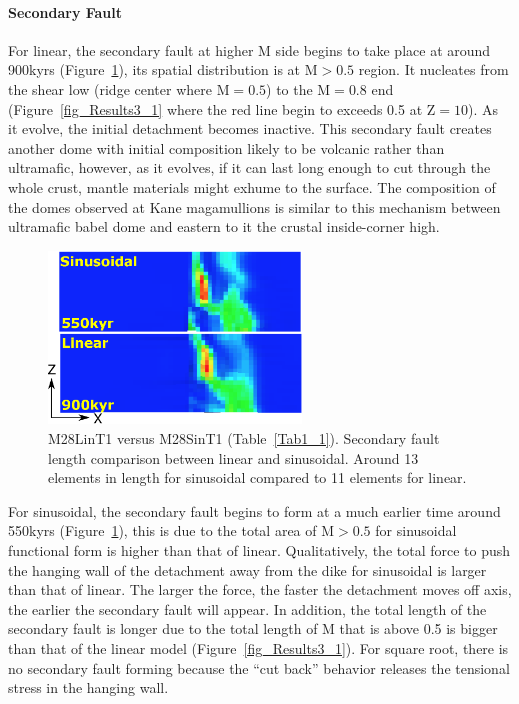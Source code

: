 \paragraph{Secondary Fault}\label{para_SecondaryFault}

For linear, the secondary fault at higher M side begins to take place at around 900kyrs (Figure~\hyperref[fig_Results4_2]{\ref{fig_Results4_2}}), its spatial distribution is at M$>0.5$ region. It nucleates from the shear low (ridge center where M$=0.5$) to the M$=0.8$ end (Figure~\hyperref[fig_Results3_1]{\ref{fig_Results3_1}} where the red line begin to exceeds 0.5 at Z$=10$). As it evolve, the initial detachment becomes inactive. This secondary fault creates another dome with initial composition likely to be volcanic rather than ultramafic, however, as it evolves, if it can last long enough to cut through the whole crust, mantle materials might exhume to the surface. The composition of the domes observed at Kane magamullions is similar to this mechanism between ultramafic babel dome and eastern to it the crustal inside-corner high. 

\begin{figure}[h]
  \centering
    \includegraphics[width=0.6\textwidth]{fig_Results4_2_secondary_fault_length_comparison.eps}
  \caption{M28LinT1 versus M28SinT1 (Table~\hyperref[Tab1_1]{\ref{Tab1_1}}). Secondary fault length comparison between linear and sinusoidal. Around 13 elements in length for sinusoidal compared to 11 elements for linear.}
 \label{fig_Results4_2}
\end{figure}   

For sinusoidal, the secondary fault begins to form at a much earlier time around 550kyrs (Figure~\hyperref[fig_Results4_2]{\ref{fig_Results4_2}}), this is due to the total area of M$>0.5$ for sinusoidal functional form is higher than that of linear. Qualitatively, the total force to push the hanging wall of the detachment away from the dike for sinusoidal is larger than that of linear. The larger the force, the faster the detachment moves off axis, the earlier the secondary fault will appear. In addition, the total length of the secondary fault is longer due to the total length of M that is above 0.5 is bigger than that of the linear model (Figure~\hyperref[fig_Results3_1]{\ref{fig_Results3_1}}). 
For square root, there is no secondary fault forming because the ``cut back'' behavior releases the tensional stress in the hanging wall.

